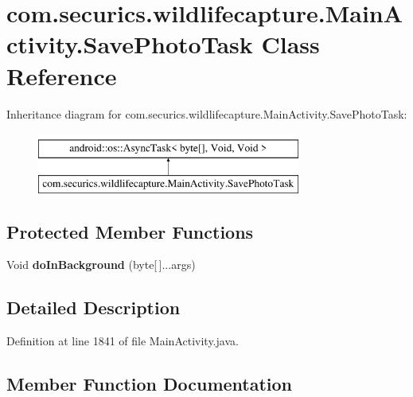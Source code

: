 \section{com.\+securics.\+wildlifecapture.\+Main\+Activity.\+Save\+Photo\+Task Class Reference}
\label{classcom_1_1securics_1_1wildlifecapture_1_1_main_activity_1_1_save_photo_task}
Inheritance diagram for com.\+securics.\+wildlifecapture.\+Main\+Activity.\+Save\+Photo\+Task\+:\begin{figure}[H]
\begin{center}
\leavevmode
\includegraphics[height=2.000000cm]{classcom_1_1securics_1_1wildlifecapture_1_1_main_activity_1_1_save_photo_task}
\end{center}
\end{figure}
\subsection*{Protected Member Functions}
\begin{DoxyCompactItemize}
\item 
Void {\bf do\+In\+Background} (byte[$\,$]...args)
\end{DoxyCompactItemize}


\subsection{Detailed Description}


Definition at line 1841 of file Main\+Activity.\+java.



\subsection{Member Function Documentation}
